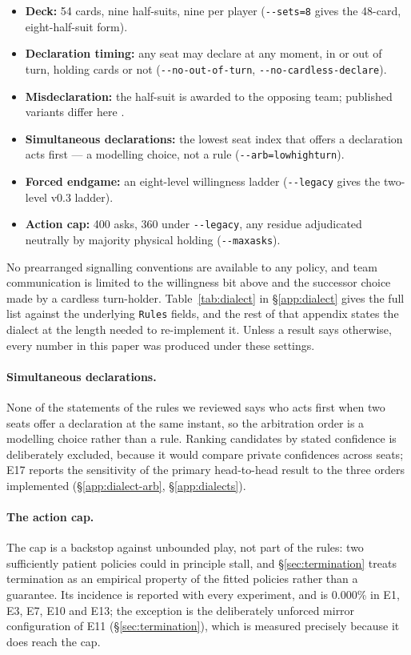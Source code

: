 \documentclass[11pt]{article}
\theoremstyle{definition}
\newcommand{\numLimitRate}{0.000\%}
\begin{document}
\begin{itemize}
  \item \textbf{Deck:} 54 cards, nine half-suits, nine per player
        (\texttt{-{}-sets=8} gives the 48-card, eight-half-suit form).
  \item \textbf{Declaration timing:} any seat may declare at any moment, in or
        out of turn, holding cards or not (\texttt{-{}-no-out-of-turn},
        \texttt{-{}-no-cardless-declare}).
  \item \textbf{Misdeclaration:} the half-suit is awarded to the opposing
        team; published variants differ here \cite{pagat}.
  \item \textbf{Simultaneous declarations:} the lowest seat index that offers a
        declaration acts first --- a modelling choice, not a rule
        (\texttt{-{}-arb=low\textbar high\textbar turn}).
  \item \textbf{Forced endgame:} an eight-level willingness ladder
        (\texttt{-{}-legacy} gives the two-level v0.3 ladder).
  \item \textbf{Action cap:} 400 asks, 360 under \texttt{-{}-legacy}, any
        residue adjudicated neutrally by majority physical holding
        (\texttt{-{}-maxasks}).
\end{itemize}

No prearranged signalling conventions are available to any policy, and team
communication is limited to the willingness bit above and the successor choice
made by a cardless turn-holder.
Table~\ref{tab:dialect} in \S\ref{app:dialect} gives the full list against the
underlying \texttt{Rules} fields, and the rest of that appendix states the
dialect at the length needed to re-implement it. Unless a result says otherwise,
every number in this paper was produced under these settings.

\paragraph{Simultaneous declarations.} None of the statements of the rules we
reviewed says who acts first when two seats offer a declaration at the same
instant, so the arbitration order is a modelling choice rather than a rule.
Ranking candidates by stated confidence is deliberately excluded, because it
would compare private confidences across seats; E17 reports the sensitivity of
the primary head-to-head result to the three orders implemented
(\S\ref{app:dialect-arb}, \S\ref{app:dialects}).

\paragraph{The action cap.} The cap is a backstop against unbounded play, not
part of the rules: two sufficiently patient policies could in principle stall,
and \S\ref{sec:termination} treats
termination as an empirical property of the fitted policies rather than a
guarantee. Its incidence is reported with every experiment, and is
\numLimitRate{} in E1, E3, E7, E10 and E13; the exception is the deliberately
unforced mirror configuration of E11 (\S\ref{sec:termination}), which is
measured precisely because it does reach the cap.
\end{document}
